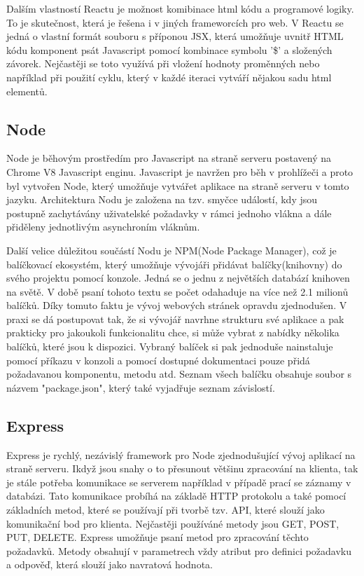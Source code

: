 Dalším vlastností Reactu je možnost komibinace html kódu a programové logiky. To je skutečnost, která je řešena i v jiných frameworcích pro web. V Reactu se jedná o vlastní formát souboru s příponou JSX, která umožňuje uvnitř HTML kódu komponent psát Javascript pomocí kombinace symbolu '\$' a složených závorek. Nejčastěji se toto využívá při vložení hodnoty proměnných nebo například při použití cyklu, který v každé iteraci vytváří nějakou sadu html elementů. 

\subsection{Node}
\cite{node}Node je běhovým prostředím pro Javascript na straně serveru postavený na Chrome V8 Javascript enginu. Javascript je navržen pro běh v prohlížeči a proto byl vytvořen Node, který umožňuje vytvářet aplikace na straně serveru v tomto jazyku. Architektura Nodu je založena na tzv. smyčce událostí, kdy jsou postupně zachytávány uživatelské požadavky v rámci jednoho vlákna a dále přiděleny jednotlivým asynchroním vláknům. 

Další velice důležitou součástí Nodu je NPM(Node Package Manager), což je balíčkovací ekosystém, který umožňuje vývojáři přidávat balíčky(knihovny) do svého projektu pomocí konzole. Jedná se o jednu z největších databází knihoven na světě. V době psaní tohoto textu se počet odahaduje na více než 2.1 milionů balíčků. Díky tomuto faktu je vývoj webových stránek opravdu zjednodušen. V praxi se dá postupovat tak, že si vývojář navrhne strukturu své aplikace a pak prakticky pro jakoukoli funkcionalitu chce, si může vybrat z nabídky několika balíčků, které jsou k dispozici. Vybraný balíček si pak jednoduše nainstaluje pomocí příkazu v konzoli a pomocí dostupné dokumentaci pouze přidá požadavanou komponentu, metodu atd. Seznam všech balíčku obsahuje soubor s názvem "package.json", který také vyjadřuje seznam závislostí.  

\subsection{Express}
\cite{express}Express je rychlý, nezávislý framework pro Node zjednodušující vývoj aplikací na straně serveru. Ikdyž jsou snahy o to přesunout většinu zpracování na klienta, tak je stále potřeba komunikace se serverem například v případě prací se záznamy v databázi. Tato komunikace probíhá na základě HTTP protokolu a také pomocí základních metod, které se používají při tvorbě tzv. API, které slouží jako komunikační bod pro klienta. Nejčastěji používáné metody jsou GET, POST, PUT, DELETE. Express umožňuje psaní metod pro zpracování těchto požadavků. Metody obsahují v parametrech vždy atribut pro definici požadavku a odpověď, která slouží jako navratová hodnota.   

